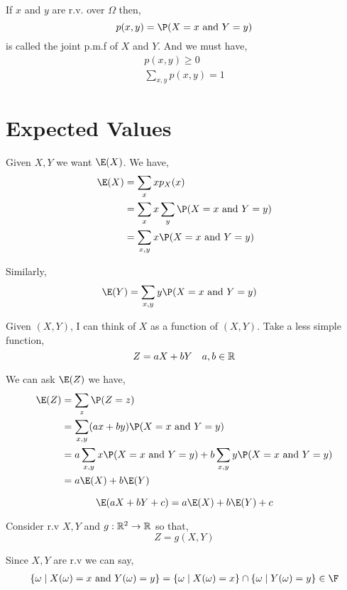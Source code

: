 \begin{definition}
	If $x$ and $y$ are r.v. over $\Omega$   then,
	$$
	p(x, y) = \P(X = x \text{ and } Y = y)
	$$
	is called the joint p.m.f of $X $ and $Y$. And we must have,
	\begin{align*}
		p(x, y) \ge 0\\
		\sum_{x, y} p(x, y) = 1
	\end{align*}
\end{definition}

\section{Expected Values}

Given $X,Y$ we want $\E(X)$. We have,
\begin{align*}
	\E(X) &= \sum_x x p_X(x)\\
	      &= \sum_x x \sum_y \P(X = x \text{ and } Y = y)\\
	      &= \sum_{x,y} x \P(X = x \text{ and } Y = y)
\end{align*}

Similarly,
\begin{align*}
	\E(Y) &= \sum_{x,y} y \P(X = x \text{ and } Y = y)
\end{align*}

Given $(X,Y)$, I can think of $X$ as a function of $(X,Y)$. Take a less simple function, $$
Z = aX + bY \quad a, b \in \mathbb{R}
$$

We can ask $\E(Z)$ we have,
\begin{align*}
	\E(Z) &= \sum_z \P(Z =z )\\
	      &= \sum_{x, y} (ax + by) \P(X = x \text{ and } Y= y)\\
	      &= a \sum_{x,y} x \P(X = x \text{ and } Y = y) + b \sum_{x, y} y \P(X = x \text{ and } Y = y)\\
	      &= a \E(X) + b \E(Y)
\end{align*}

\begin{corollary}
	$$
	\E(aX + bY + c) = a\E(X) + b\E(Y) + c
	$$
\end{corollary}

Consider r.v $X, Y$ and $g: \mathbb{R}^2 \to \mathbb{R}$ so that, $$
	Z = g(X,Y)
$$


Since $X, Y$ are r.v we can say,
\begin{align*}
	\{\omega \mid X(\omega)  = x \text{ and } Y(\omega) = y\} = \{\omega \mid X(\omega) = x\}  \cap \{\omega \mid Y(\omega) = y\} \in \F
\end{align*}


